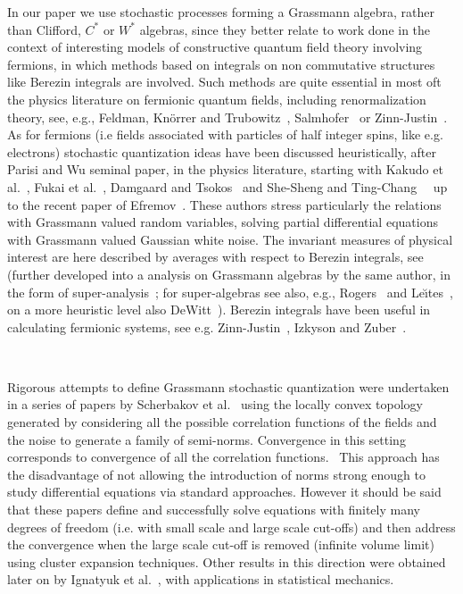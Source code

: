 \documentclass{article}
\begin{document}
In our paper we use stochastic processes forming a Grassmann algebra, rather
than Clifford, $C^{\ast}$ or $W^{\ast}$ algebras, since they better relate to
work done in the context of interesting models of constructive quantum field
theory involving fermions, in which methods based on integrals on non
commutative structures like Berezin integrals are involved. Such methods are
quite essential in most oft the physics literature on fermionic quantum
fields, including renormalization theory, see, e.g., Feldman, Kn{\"o}rrer and
Trubowitz~{\cite{MR1905424}}, Salmhofer~{\cite{salmhofer_renormalization}} or
Zinn-Justin~{\cite{ZinnJustin}}. As for fermions (i.e fields associated with
particles of half integer spins, like e.g. electrons) stochastic quantization
ideas have been discussed heuristically, after Parisi and Wu seminal paper, in
the physics literature, starting with Kakudo et al.~{\cite{kakudo1983gauge}},
Fukai et al.~{\cite{fukai_stochastic_1983}}, Damgaard and
Tsokos~{\cite{damgaard_stochastic_1984}} and She-Sheng and
Ting-Chang~{\cite{she-sheng_stochastic_1985}} \ up to the recent paper of
Efremov~{\cite{efremov_stochastic_2019}}. These authors stress particularly
the relations with Grassmann valued random variables, solving partial
differential equations with Grassmann valued Gaussian white noise. The
invariant measures of physical interest are here described by averages with
respect to Berezin integrals, see~{\cite{Berezin1}} (further developed into a
analysis on Grassmann algebras by the same author, in the form of
super-analysis~{\cite{Berezin2}}; for super-algebras see also, e.g.,
Rogers~{\cite{Rogers2007}} and Le\u{\i}tes~{\cite{Leites}}, on a more heuristic
level also DeWitt~{\cite{DeWitt}}). Berezin integrals have been useful in
calculating fermionic systems, see e.g. Zinn-Justin~{\cite{ZinnJustin}},
Izkyson and Zuber~{\cite{Itzykson}}.

\

Rigorous attempts to define Grassmann stochastic quantization were undertaken
in a series of papers by Scherbakov et
al.~{\cite{shcherbakov_elements_1993,shcherbakov_elements_1993-1,shcherbakov_elements_1993-2}}
using the locally convex topology generated by considering all the possible
correlation functions of the fields and the noise to generate a family of
semi-norms. Convergence in this setting corresponds to convergence of all the
correlation functions. \ This approach has the disadvantage of not allowing
the introduction of norms strong enough to study differential equations via
standard approaches. However it should be said that these papers define and
successfully solve equations with finitely many degrees of freedom (i.e. with
small scale and large scale cut-offs) and then address the convergence when
the large scale cut-off is removed (infinite volume limit) using cluster
expansion techniques. Other results in this direction were obtained later on
by Ignatyuk et al.~{\cite{ignatyuk_convergence_1993}}, with applications in
statistical mechanics.
\end{document}
